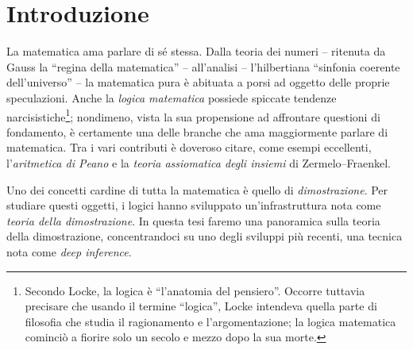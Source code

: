 \documentclass[12pt,a4paper,openright,twoside]{report}
\begin{document}
\chapter*{Introduzione}

La matematica ama parlare di s\'e stessa. Dalla teoria dei numeri -- ritenuta da Gauss la ``regina della matematica'' -- all'analisi -- l'hilbertiana ``sinfonia coerente dell'universo'' -- la matematica pura \`e abituata a porsi ad oggetto delle proprie speculazioni. Anche la \emph{logica matematica} possiede spiccate tendenze narcisistiche\footnote{Secondo Locke, la logica \`e ``l'anatomia del pensiero''. Occorre tuttavia precisare che usando il termine ``logica'', Locke intendeva quella parte di filosofia che studia il ragionamento e l'argomentazione; la logica matematica cominci\`o a fiorire solo un secolo e mezzo dopo la sua morte.}; nondimeno, vista la sua propensione ad affrontare questioni di fondamento, \`e certamente una delle branche che ama maggiormente parlare di matematica. Tra i vari contributi \`e doveroso citare, come esempi eccellenti, l'\emph{aritmetica di Peano} e la \emph{teoria assiomatica degli insiemi} di Zermelo--Fraenkel.

Uno dei concetti cardine di tutta la matematica \`e quello di \emph{dimostrazione}. Per studiare questi oggetti, i logici hanno sviluppato un'infrastruttura nota come \emph{teoria della dimostrazione}. In questa tesi faremo una panoramica sulla teoria della dimostrazione, concentrandoci su uno degli sviluppi pi\`u recenti, una tecnica nota come \emph{deep inference}.
\end{document}
